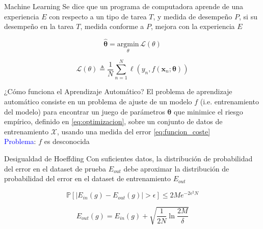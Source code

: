 \documentclass{beamer}
\begin{document}
\begin{frame}{Machine Learning}
     Se dice que un programa de computadora aprende de una experiencia $E$ con respecto a un tipo de tarea $T$, y medida de desempeño $P$, si su desempeño en la tarea $T$, medida conforme a $P$, mejora con la experiencia $E$ \parencite{mitchell2007machine}

    \begin{equation}\label{eq:optimizacion}
        \hat{\mathbf{\theta}} = \underset{\theta}{\mathrm{argmin}}\,\mathcal{L}(\theta)
    \end{equation}

    \begin{equation}\label{eq:funcion_coste}
        \mathcal{L}(\theta)  \triangleq \frac{1}{N}\sum_{n=1}^N\ell(y_n,f(\mathbf{x}_n;\mathbf{\theta}))
    \end{equation}
     
\end{frame}

\begin{frame}{¿Cómo funciona el Aprendizaje Automático?}
    El problema de aprendizaje automático consiste en un problema de ajuste de un modelo $f$ (i.e. entrenamiento del modelo) para encontrar un juego de parámetros $\mathbf{\theta}$ que minimice el riesgo empírico, definido en \eqref{eq:optimizacion}, sobre un conjunto de datos de entrenamiento $\mathbf{\mathcal{X}}$, usando una medida del error \eqref{eq:funcion_coste}
    \\
    \textcolor{blue}{Problema}: $f$ es desconocida
\end{frame}

\begin{frame}{Desigualdad de Hoeffding}
    Con suficientes datos, la distribución de probabilidad del error en el dataset de prueba $E_{out}$ debe aproximar la distribución de probabilidad del error en el dataset de entrenamiento $E_{out}$

    \begin{equation}\label{eq:hoefdding}
        \mathbb{P}[|E_{in}(g) - E_{out}(g)|>\epsilon] \leq 2Me^{-2\epsilon^2N}
    \end{equation}

    \begin{equation}\label{eq:limiteGeneralizacion}
        E_{out}(g) = E_{in}(g)+\sqrt{\frac{1}{2N}\ln\frac{2M}{\delta}}
    \end{equation}
    
\end{frame}
\end{document}
